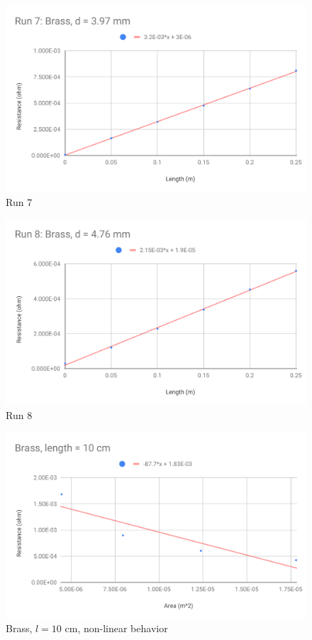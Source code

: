 %
\begin{figure}[ht]
	\centering
	\includegraphics[scale=0.74]{image/02-resistance/run7.pdf}
	\caption{Run 7}
	\label{figure.02.run.7}
\end{figure}
%
\begin{figure}[ht]
	\centering
	\includegraphics[scale=0.74]{image/02-resistance/run8.pdf}
	\caption{Run 8}
	\label{figure.02.run.8}
\end{figure}
%
\begin{figure}[ht]
	\centering
	\includegraphics[scale=0.74]{image/02-resistance/10cm-non-linear.pdf}
	\caption{Brass, $l = 10$ cm, non-linear behavior}
	\label{figure.02.10cm.non.linear}
\end{figure}

